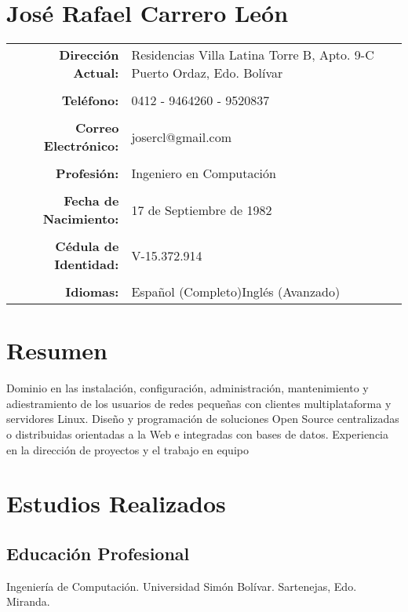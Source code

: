 \documentclass[letterpaper,11pt]{report}
\begin{document}
\section*{José Rafael Carrero León}

\begin{tabular}{r p{2.4in} p{46mm}}
\textbf{Dirección Actual:}&Residencias Villa Latina\newline
Torre B, Apto. 9-C \newline
Puerto Ordaz, Edo. Bolívar &  \\%
 & & \\
\textbf{Teléfono:}&0412 - 9464260\newline 0286 - 9520837&\\
 & & \\
\textbf{Correo Electrónico:}&josercl@gmail.com&\\
 & & \\
\textbf{Profesión:}&Ingeniero en Computación&\\
 & & \\
\textbf{Fecha de Nacimiento:}&17 de Septiembre de 1982&\\
 & & \\
\textbf{Cédula de Identidad:}&V-15.372.914&\\
 & & \\
\textbf{Idiomas:}&Espa\~{n}ol (Completo)\newline Inglés (Avanzado)&\\
\end{tabular}


\section*{Resumen}
Dominio en las instalación, configuración, administración, mantenimiento y adiestramiento de los usuarios de redes peque\~{n}as con clientes multiplataforma y servidores Linux. Dise\~{n}o y programación de soluciones Open Source centralizadas o distribuidas orientadas a la Web e integradas con bases de datos. Experiencia en la dirección de proyectos y el trabajo en equipo

\section*{Estudios Realizados}
\subsection*{Educación Profesional}
Ingeniería de Computación. Universidad Simón Bolívar. Sartenejas, Edo. Miranda.
\end{document}
